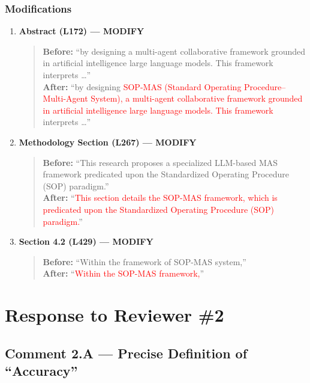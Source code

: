 \documentclass[11pt,a4paper]{article}
\begin{document}
\subsubsection{Modifications}
\begin{enumerate}
\item \textbf{Abstract (L172) --- MODIFY}
\begin{quote}
\textbf{Before:} ``by designing a multi-agent collaborative framework grounded in artificial intelligence large language models. This framework interprets \ldots''\\[4pt]
\textbf{After:} ``by designing \textcolor{red}{SOP-MAS (Standard Operating Procedure--Multi-Agent System), a multi-agent collaborative framework grounded in artificial intelligence large language models. This framework} interprets \ldots''
\end{quote}

\item \textbf{Methodology Section (L267) --- MODIFY}
\begin{quote}
\textbf{Before:} ``This research proposes a specialized LLM-based MAS framework predicated upon the Standardized Operating Procedure (SOP) paradigm.''\\[4pt]
\textbf{After:} ``\textcolor{red}{This section details the SOP-MAS framework, which is predicated upon the Standardized Operating Procedure (SOP) paradigm.}''
\end{quote}

\item \textbf{Section 4.2 (L429) --- MODIFY}
\begin{quote}
\textbf{Before:} ``Within the framework of SOP-MAS system,''\\[4pt]
\textbf{After:} ``\textcolor{red}{Within the SOP-MAS framework,}''
\end{quote}
\end{enumerate}


\newpage
\section{Response to Reviewer \#2}

\subsection{Comment 2.A --- Precise Definition of ``Accuracy''}
\end{document}
